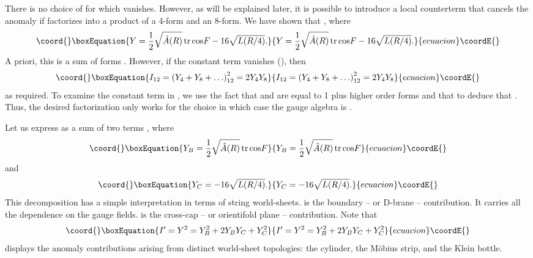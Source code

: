 \documentclass[a4paper,12pt]{article}
\begin{document}
There is no choice of \coordHE{} for which \coordHE{}
vanishes. However, as will be explained later, it is possible to
introduce a local counterterm that cancels the anomaly if \coordHE{}
factorizes into a product of a 4-form and an 8-form. We have shown
that \coordHE{}, where
\begin{equation}\coord{}\boxEquation{
Y =  {1 \over 2}\sqrt{\hat A (R)} \, {\rm tr} \, {\rm cos} F - 16
\sqrt{ L(R/4)} .
}{
Y =  {1 \over 2}\sqrt{\hat A (R)} \, {\rm tr} \, {\rm cos} F - 16
\sqrt{ L(R/4)} .
}{ecuacion}\coordE{}\end{equation}
A priori, this is a sum of forms \coordHE{}.
However, if the constant term vanishes (\coordHE{}), then
\begin{equation}\coord{}\boxEquation{
I_{12} = \left(Y_4 + Y_8 + \ldots \right)_{12}^2 = 2 Y_4 Y_8
}{
I_{12} = \left(Y_4 + Y_8 + \ldots \right)_{12}^2 = 2 Y_4 Y_8
}{ecuacion}\coordE{}\end{equation}
as required. To examine the constant term in \coordHE{}, we use the fact
that \coordHE{} and \coordHE{} are equal to 1 plus higher order forms and
that \coordHE{} to deduce that \coordHE{}. Thus, the desired factorization only works for the
choice \coordHE{} in which case the gauge algebra is \coordHE{}.

Let us express \coordHE{} as a sum of two terms \coordHE{}, where
\begin{equation}\coord{}\boxEquation{
Y_B =  {1 \over 2}\sqrt{\hat A (R)} \, {\rm tr} \, {\rm cos} F
}{
Y_B =  {1 \over 2}\sqrt{\hat A (R)} \, {\rm tr} \, {\rm cos} F
}{ecuacion}\coordE{}\end{equation}
and
\begin{equation}\coord{}\boxEquation{
Y_C =  - 16 \sqrt{ L(R/4)} .
}{
Y_C =  - 16 \sqrt{ L(R/4)} .
}{ecuacion}\coordE{}\end{equation}
This decomposition has a simple interpretation in terms of string
world-sheets. \coordHE{} is the boundary -- or D-brane -- contribution.
It carries all the dependence on the gauge fields. \coordHE{} is the
cross-cap -- or orientifold plane -- contribution. Note that
\begin{equation}\coord{}\boxEquation{
I' = Y^2 = Y_B^2 + 2Y_B Y_C + Y_C^2
}{
I' = Y^2 = Y_B^2 + 2Y_B Y_C + Y_C^2
}{ecuacion}\coordE{}\end{equation}
displays the anomaly contributions arising from distinct
world-sheet topologies: the cylinder, the M\"obius strip, and the
Klein bottle.
\end{document}
